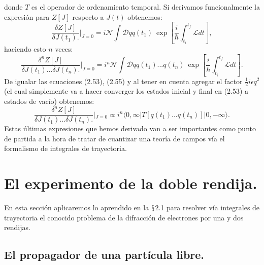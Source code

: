donde $T$ es el operador de ordenamiento temporal. Si derivamos funcionalmente la expresión para $Z[J]$ respecto a $J(t)$ obtenemos:
\begin{equation}
\frac{\delta Z[J]}{\delta J(t_{1}).}|_{J=0}=i\mathcal{N}\int\mathcal{D}qq(t_{1})\ \exp\left[\frac{i}{\hbar}\int_{t_{i}}^{t_{f}}\mathcal{L}dt\right],
\end{equation}	
haciendo esto $n$ veces:
\begin{equation}
\frac{\delta^{n}Z[J]}{\delta J(t_{1})...\delta J(t_{n}).}|_{J=0}=i^{n}\mathcal{N}\int\mathcal{D}qq(t_{1})...q(t_{n})\ \exp\left[\frac{i}{\hbar}\int_{t_{i}}^{t_{f}}\mathcal{L}dt\right].
\end{equation}
De igualar las ecuaciones (2.53), (2.55) y al tener en cuenta agregar el factor $\frac{1}{2}i\epsilon q^2$ (el cual simplemente va a hacer converger los estados inicial y final en (2.53) a estados de vacío) obtenemos:
\begin{equation}
\frac{\delta^{n}Z[J]}{\delta J(t_{1})...\delta J(t_{n}).}|_{J=0}\propto i^{n}\langle0,\infty|T[q(t_{1})...q(t_{n})]|0,-\infty\rangle .
\end{equation}
Estas últimas expresiones que hemos derivado van a ser importantes como punto de partida a la hora de tratar de cuantizar una teoría de campos vía el formalismo de integrales de trayectoria.
\newpage


\section{El experimento de la doble rendija.}
En esta sección aplicaremos lo aprendido en la $\mathsection$2.1 para resolver vía integrales de trayectoria el conocido problema de la difracción de electrones por una y dos rendijas. 

\subsection{El propagador de una partícula libre.}

